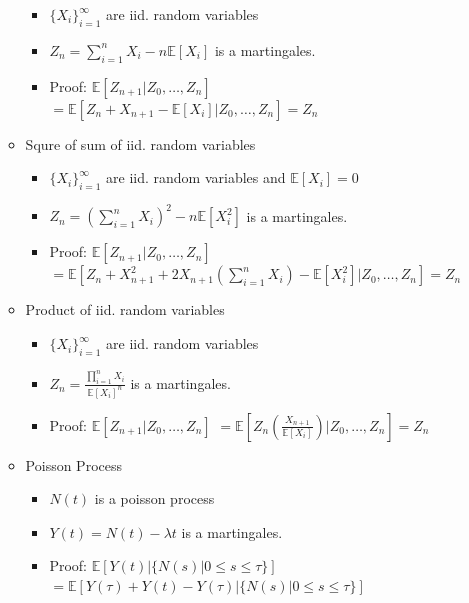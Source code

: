 \documentclass[a4paper]{article}
\begin{document}
\begin{itemize}
\begin{itemize}
                \begin{itemize}
                    \item $\{X_i\}_{i=1}^\infty$ are iid. random variables
                    \item $Z_n = \sum_{i=1}^n X_i - n \mathbb{E}[X_i]$ is a martingales.
                    \item Proof: $\mathbb{E}[Z_{n+1}| Z_0, \dots, Z_n]$
                        $= \mathbb{E}[Z_n + X_{n+1} - \mathbb{E}[X_i]| Z_0, \dots, Z_n] = Z_n$
                \end{itemize}
            \item Squre of sum of iid. random variables
                \begin{itemize}
                    \item $\{X_i\}_{i=1}^\infty$ are iid. random variables and $\mathbb{E}[X_i] = 0$
                    \item $Z_n = (\sum_{i=1}^n X_i)^2 - n \mathbb{E}[X_i^2]$ is a martingales.
                    \item Proof: $\mathbb{E}[Z_{n+1}| Z_0, \dots, Z_n]$
                        $= \mathbb{E}[Z_n + X_{n+1}^2 + 2X_{n+1}(\sum_{i=1}^n X_i) - \mathbb{E}[X_i^2]| Z_0, \dots, Z_n] = Z_n$
                \end{itemize}
            \item Product of iid. random variables
                \begin{itemize}
                    \item $\{X_i\}_{i=1}^\infty$ are iid. random variables
                    \item $Z_n = \frac{\prod_{i=1}^n X_i}{\mathbb{E}[X_i]^n}$ is a martingales.
                    \item Proof: $\mathbb{E}[Z_{n+1}| Z_0, \dots, Z_n]$
                        $= \mathbb{E}[Z_n(\frac{X_{n+1}}{\mathbb{E}[X_i]})| Z_0, \dots, Z_n] = Z_n$
                \end{itemize}
            \item Poisson Process
                \begin{itemize}
                    \item $N(t)$ is a poisson process
                    \item $Y(t) = N(t) - \lambda t$ is a martingales.
                    \item Proof: $\mathbb{E}[Y(t)| \{N(s) | 0 \leq s \leq \tau\}]$
                        $= \mathbb{E}[Y(\tau) + Y(t) - Y(\tau)| \{N(s) | 0 \leq s \leq \tau\}]$


\end{itemize}
\end{itemize}
\end{itemize}
\end{document}
